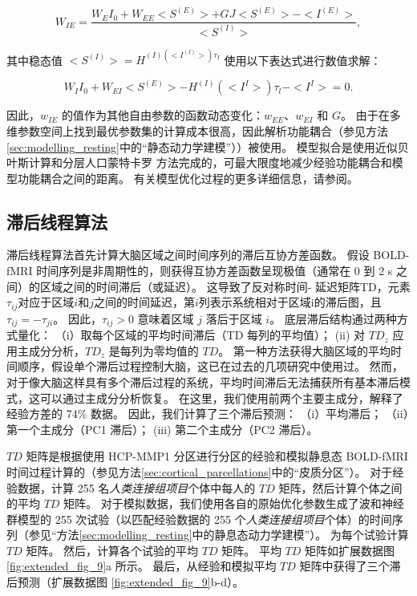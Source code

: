 \documentclass[lang=cn,a4paper,newtx,citestyle=gb7714-2015, bibstyle=gb7714-2015]{elegantpaper}
\begin{document}
\begin{equation}\label{eq:analytic_expression}
	W_{IE} = 
		\frac{
			W_E I_0 + W_{EE} <S^{(E)}> + GJ <S^{(E)}> - <I^{(E)}>
			}
			{
				<S^{(I)}>
			},
\end{equation}

其中稳态值 $ <S^{(I)}> = H^{(I) (<I^{(I)}>) \tau_I } $ 使用以下表达式进行数值求解：

\begin{equation}\label{eq:solved_expression}
	W_I I_0 
	+ W_{EI}<S^{(E)}> 
	- H^{(I)} (<I^{I}>) \tau_l
	- <I^{I}>
	= 0.
\end{equation}

因此，$ w_{IE} $ 的值作为其他自由参数的函数动态变化：$ w_{EE} $、$ w_{EI} $ 和 $ G $。
由于在多维参数空间上找到最优参数集的计算成本很高，因此解析功能耦合（参见方法\ref{sec:modelling_resting}中的“静态动力学建模”））被使用。
模型拟合是使用近似贝叶斯计算和分层人口蒙特卡罗 \cite{arnatkeviciute2021genetic,pang2022evolutionary} 方法完成的，可最大限度地减少经验功能耦合和模型功能耦合之间的距离。
有关模型优化过程的更多详细信息，请参阅\cite{rosen2022estimation}。


\subsection{滞后线程算法} \label{sec:lag_threads}

滞后线程算法首先计算大脑区域之间时间序列的滞后互协方差函数。
假设 BOLD-fMRI 时间序列是非周期性的\cite{aquino2020identifying}，则获得互协方差函数呈现极值（通常在 0 到 2 s 之间）的区域之间的时间滞后（或延迟）\cite{gajwani2022can}。
这导致了反对称时间- 延迟矩阵TD，元素$ \tau_{ij} $对应于区域$ i $和$ j $之间的时间延迟，第$ i $列表示系统相对于区域i的滞后图，且$ \tau_{ij}=- \tau_{ji} $。
因此，$ \tau_{ij}>0 $ 意味着区域 $ j $ 落后于区域 $ i $。
底层滞后结构通过两种方式量化：
（i）取每个区域的平均时间滞后（TD 每列的平均值）； 
(ii) 对 $ TD_z $ 应用主成分分析，$ TD_z $ 是每列为零均值的 $ TD $。
第一种方法获得大脑区域的平均时间顺序，假设单个滞后过程控制大脑，这已在过去的几项研究中使用过\cite{gajwani2022can,hamid2021wave,yousefi2021propagating}。
然而，对于像大脑这样具有多个滞后过程的系统，平均时间滞后无法捕获所有基本滞后模式，这可以通过主成分分析\cite{coalson2018impact}恢复。
在这里，我们使用前两个主要主成分，解释了经验方差的 74\% 数据。
因此，我们计算了三个滞后预测：
（i）平均滞后； 
（ii）第一个主成分（PC1 滞后）； (iii) 第二个主成分（PC2 滞后）。


$ TD $ 矩阵是根据使用 HCP-MMP1 分区进行分区的经验和模拟静息态 BOLD-fMRI 时间过程计算的（参见方法\ref{sec:cortical_parcellations}中的“皮质分区”）。
对于经验数据，计算 255 名\textit{人类连接组项目}个体中每人的 $ TD $ 矩阵，然后计算个体之间的平均 $ TD $ 矩阵。
对于模拟数据，我们使用各自的原始优化参数生成了波和神经群模型的 255 次试验（以匹配经验数据的 255 个\textit{人类连接组项目}个体）的时间序列（参见“方法\ref{sec:modelling_resting}中的静息态动力学建模”）。
为每个试验计算 $ TD $ 矩阵。
然后，计算各个试验的平均 $ TD $ 矩阵。
平均 $ TD $ 矩阵如扩展数据图 \ref{fig:extended_fig_9}a 所示。
最后，从经验和模拟平均 $ TD $ 矩阵中获得了三个滞后预测（扩展数据图 \ref{fig:extended_fig_9}b-d）。
\end{document}
